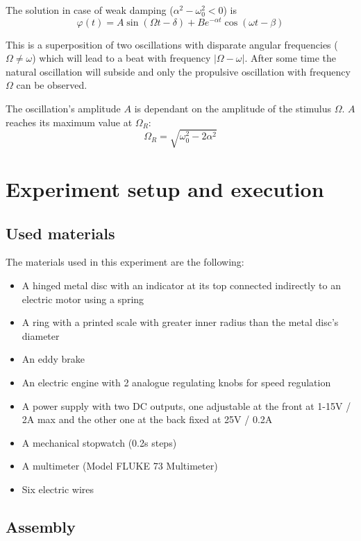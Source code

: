 \documentclass{scrreprt}
\renewcommand{\phi}{\varphi}
\begin{document}
The solution in case of weak damping ($\alpha^2 - \omega_0^2 < 0$) is
\begin{equation}
\phi(t) = A \sin{(\Omega t - \delta)} + B e^{-\alpha t} \cos{(\omega t - \beta)} \label{eq:forceddampedsolution}
\end{equation}

This is a superposition of two oscillations with disparate angular frequencies ($\Omega \neq \omega$) which will lead to a beat with frequency $\lvert \Omega - \omega \rvert$. After some time the natural oscillation will subside and only the propulsive oscillation with frequency $\Omega$ can be observed. 

The oscillation's amplitude $A$ is dependant on the amplitude of the stimulus $\Omega$. $A$ reaches its maximum value at $\Omega_R$:
\begin{equation}
\Omega_R = \sqrt{\omega_0^2-2\alpha^2}
\label{eq:}
\end{equation}

\section{Experiment setup and execution}
\subsection{Used materials}
The materials used in this experiment are the following:
\begin{itemize}
\item A hinged metal disc with an indicator at its top connected indirectly to an electric motor using a spring
\item A ring with a printed scale with greater inner radius than the metal disc's diameter
\item An eddy brake
\item An electric engine with 2 analogue regulating knobs for speed regulation
\item A power supply with two DC outputs, one adjustable at the front at 1-15V / 2A max and the other one at the back fixed at 25V / 0.2A
\item A mechanical stopwatch (0.2s steps)
\item A multimeter (Model FLUKE 73 Multimeter)
\item Six electric wires
\end{itemize}

\subsection{Assembly}
\end{document}
